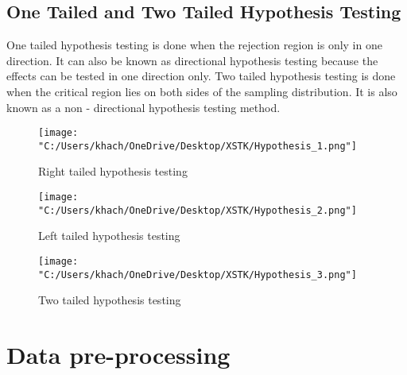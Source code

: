 \documentclass[a4paper]{article}
\begin{document}
	\subsection{One Tailed and Two Tailed Hypothesis Testing}
	One tailed hypothesis testing is done when the rejection region is only in one direction. It can also be known as directional hypothesis testing because the effects can be tested in one direction only. Two tailed hypothesis testing is done when the critical region lies on both sides of the sampling distribution. It is also known as a non - directional hypothesis testing method.\\
	\begin{figure}[htbp]
		\centering
		\begin{adjustbox}{width=0.7\textwidth, frame}
			\texttt{[image: "C:/Users/khach/OneDrive/Desktop/XSTK/Hypothesis\_1.png"]}
		\end{adjustbox}
		\captionsetup{justification=centering}
		\vspace{0.5cm}
		\caption{Right tailed hypothesis testing}
		\label{fig:data_table}
	\end{figure}
	\begin{figure}[htbp]
		\centering
		\begin{adjustbox}{width=0.7\textwidth, frame}
			\texttt{[image: "C:/Users/khach/OneDrive/Desktop/XSTK/Hypothesis\_2.png"]}
		\end{adjustbox}
		\captionsetup{justification=centering}
		\vspace{0.5cm}
		\caption{Left tailed hypothesis testing}
		\label{fig:data_table}
	\end{figure}
		\begin{figure}[htbp]
		\centering
		\begin{adjustbox}{width=0.7\textwidth, frame}
			\texttt{[image: "C:/Users/khach/OneDrive/Desktop/XSTK/Hypothesis\_3.png"]}
		\end{adjustbox}
		\captionsetup{justification=centering}
		\vspace{0.5cm}
		\caption{Two tailed hypothesis testing}
		\label{fig:data_table}
	\end{figure}
	\section{Data pre-processing}
\end{document}
